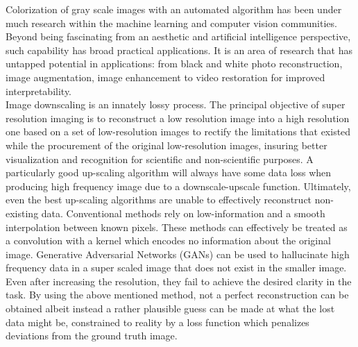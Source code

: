 \documentclass{article} %
\begin{document}
Colorization of gray scale images with an automated algorithm has been under much research within the machine learning and computer vision communities. Beyond being fascinating from an aesthetic and artificial intelligence perspective, such capability has broad practical applications. It is an area of research that has untapped potential in applications: from black and white photo reconstruction, image augmentation, image enhancement to video restoration for improved interpretability. \\
\hspace*{0.167 in}Image downscaling is an innately lossy process. The principal objective of super resolution imaging is to reconstruct a low resolution image into a high resolution one based on a set of low-resolution images to rectify the limitations that existed while the procurement of the original low-resolution images, insuring better visualization and recognition for scientific and non-scientific purposes. A particularly good up-scaling algorithm will always have some data loss when producing high frequency image due to a downscale-upscale function. Ultimately, even the best up-scaling algorithms are unable to effectively reconstruct non-existing data. Conventional methods rely on low-information and a smooth interpolation between known pixels. These methods can effectively be treated as a convolution with a kernel which encodes no information about the original image. Generative Adversarial Networks (GANs) can be used to hallucinate high frequency data in a super scaled image that does not exist in the smaller image. Even after increasing the resolution, they fail to achieve the desired clarity in the task. By using the above mentioned method, not a perfect reconstruction can be obtained albeit instead a rather plausible guess can be made at what the lost data might be, constrained to reality by a loss function which penalizes deviations from the ground truth image.\\
\end{document}
